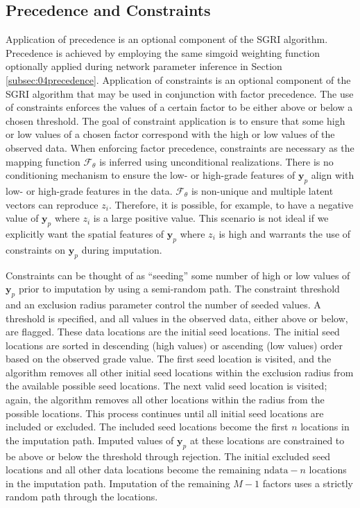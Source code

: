 \subsection{Precedence and Constraints}
\label{subsec:05constraints}

Application of precedence is an optional component of the \gls{SGRI} algorithm. Precedence is achieved by employing the same simgoid weighting function optionally applied during network parameter inference in Section \ref{subsec:04precedence}. Application of constraints is an optional component of the \gls{SGRI} algorithm that may be used in conjunction with factor precedence. The use of constraints enforces the values of a certain factor to be either above or below a chosen threshold. The goal of constraint application is to ensure that some high or low values of a chosen factor correspond with the high or low values of the observed data. When enforcing factor precedence, constraints are necessary as the mapping function $\mathcal{F}_{\theta}$ is inferred using unconditional realizations. There is no conditioning mechanism to ensure the low- or high-grade features of $\mathbf{y}_{p}$ align with low- or high-grade features in the data. $\mathcal{F}_{\theta}$ is non-unique and multiple latent vectors can reproduce $z_{i}$. Therefore, it is possible, for example, to have a negative value of $\mathbf{y}_{p}$ where $z_{i}$ is a large positive value. This scenario is not ideal if we explicitly want the spatial features of $\mathbf{y}_{p}$ where $z_{i}$ is high and warrants the use of constraints on $\mathbf{y}_{p}$ during imputation.

Constraints can be thought of as ``seeding'' some number of high or low values of $\mathbf{y}_{p}$ prior to imputation by using a semi-random path. The constraint threshold and an exclusion radius parameter control the number of seeded values. A threshold is specified, and all values in the observed data, either above or below, are flagged. These data locations are the initial seed locations. The initial seed locations are sorted in descending (high values) or ascending (low values) order based on the observed grade value. The first seed location is visited, and the algorithm removes all other initial seed locations within the exclusion radius from the available possible seed locations. The next valid seed location is visited; again, the algorithm removes all other locations within the radius from the possible locations. This process continues until all initial seed locations are included or excluded. The included seed locations become the first $n$ locations in the imputation path. Imputed values of $\mathbf{y}_{p}$ at these locations are constrained to be above or below the threshold through rejection. The initial excluded seed locations and all other data locations become the remaining $\text{ndata} - n$ locations in the imputation path. Imputation of the remaining $M-1$ factors uses a strictly random path through the locations.

